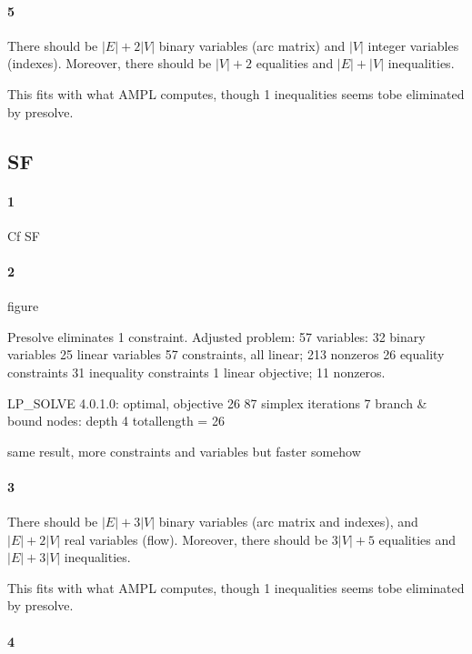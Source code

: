 \documentclass{article}
\begin{document}
\paragraph{5}

There should be $|E|+2|V|$ binary variables (arc matrix) and $|V|$ integer variables (indexes). Moreover, there should be $|V|+2$ equalities and $|E|+|V|$ inequalities.

This fits with what AMPL computes, though 1 inequalities seems tobe eliminated by presolve.

\subsection{SF}

\paragraph{1}

Cf SF

\paragraph{2}

figure

Presolve eliminates 1 constraint.
Adjusted problem:
57 variables:
	32 binary variables
	25 linear variables
57 constraints, all linear; 213 nonzeros
	26 equality constraints
	31 inequality constraints
1 linear objective; 11 nonzeros.

LP_SOLVE 4.0.1.0: optimal, objective 26
87 simplex iterations
7 branch \& bound nodes: depth 4
totallength = 26

same result, more constraints and variables but faster somehow

\paragraph{3}

There should be $|E|+3|V|$ binary variables (arc matrix and indexes), and $|E|+2|V|$ real variables (flow). Moreover, there should be $3|V|+5$ equalities and $|E|+3|V|$ inequalities.

This fits with what AMPL computes, though 1 inequalities seems tobe eliminated by presolve.

\paragraph{4}
\end{document}

